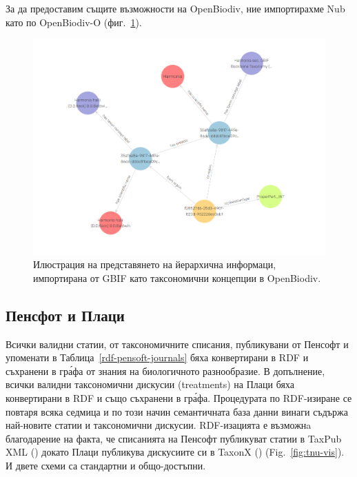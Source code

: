 За да предоставим същите възможности на OpenBiodiv, ние  импортирахме Nub като  по OpenBiodiv-O (фиг.~\ref {fig:harmonia-halii-visual}).
\begin{figure}
\centering
\includegraphics[width=\textwidth]{Figures/harmonia-halii-visgraph}
\decoRule
\caption[Visual graph of \emph{Harmonia halii}]{Илюстрация на представянето на йерархична информаци, импортирана от GBIF като таксономични концепции в OpenBiodiv.}
\label{fig:harmonia-halii-visual}
\end{figure}


\subsection{Пенсфот и Плаци}

Всички валидни статии, от таксономичните списания, публикувани  от Пенсофт и упоменати в Таблица~\ref{rdf-pensoft-journals} бяха конвертирани в RDF и съхранени в гр\'{а}фа от знания на биологичното разнообразие. В допълнение, всички валидни таксономични дискусии (treatments) на Плаци бяха конвертирани в RDF и също съхранени в гр\'{а}фа. Процедурата по RDF-изиране се повтаря всяка седмица и по този начин семантичната база данни винаги съдържа най-новите статии и таксономични дискусии. RDF-изацията е възможнa благодарение на факта, че списанията на Пенсофт публикуват статии в TaxPub XML (\cite{catapano_taxpub:_2010}) докато Плаци публикува дискусиите си в TaxonX (\cite{penev_xml_2011}) (Fig.~\ref{fig:tnu-vis}). И двете схеми са стандартни и общо-достъпни.

